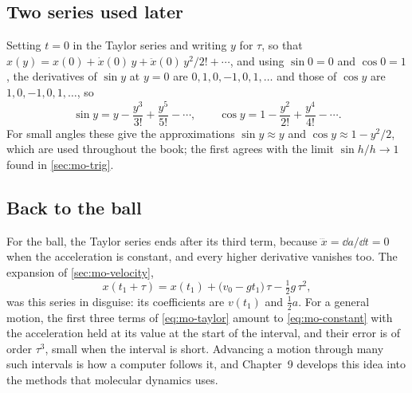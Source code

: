 \subsection*{Two series used later}

Setting $t = 0$ in the Taylor series and writing $y$ for $\tau$, so that
$x(y) = x(0) + \dot{x}(0)\,y + \ddot{x}(0)\,y^2/2! + \dotsb$, and using
$\sin 0 = 0$ and $\cos 0 = 1$, the
derivatives of $\sin y$ at $y = 0$ are $0, 1, 0, -1, 0, 1, \dots$ and
those of $\cos y$ are $1, 0, -1, 0, 1, \dots$, so
\begin{equation}
   \sin y = y - \frac{y^3}{3!} + \frac{y^5}{5!} - \dotsb, \qquad
   \cos y = 1 - \frac{y^2}{2!} + \frac{y^4}{4!} - \dotsb .
   \label{eq:mo-sin-series}
\end{equation}
For small angles these give the approximations $\sin y \approx y$ and
$\cos y \approx 1 - y^2/2$, which are used throughout the book; the
first agrees with the limit $\sin h/h \to 1$ found in \cref{sec:mo-trig}.

\subsection*{Back to the ball}

For the ball, the Taylor series ends after its third term, because
$\dddot{x} = \dd a/\dd t = 0$ when the acceleration is constant, and
every higher derivative vanishes too. The expansion of
\cref{sec:mo-velocity},
\begin{equation*}
   x(t_1+\tau) = x(t_1) + \bigl(v_0 - g t_1\bigr)\,\tau - \tfrac12 g\,\tau^2 ,
\end{equation*}
was this series in disguise: its coefficients are $v(t_1)$ and
$\tfrac12 a$. For a general motion, the first three terms of
\cref{eq:mo-taylor} amount to \cref{eq:mo-constant} with the acceleration
held at its value at the start of the interval, and their error is of
order $\tau^3$, small when the interval is short. Advancing a motion
through many such intervals is how a computer follows it, and Chapter~9
develops this idea into the methods that molecular dynamics uses.

